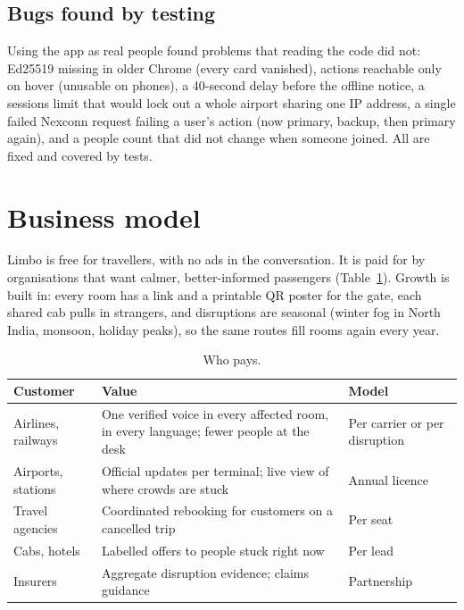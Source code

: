 \documentclass[10pt,twocolumn]{article}
\begin{document}
\subsection{Bugs found by testing}
Using the app as real people found problems that reading the code did not: Ed25519 missing in older Chrome (every card
vanished), actions reachable only on hover (unusable on phones), a 40-second delay before the offline notice, a
sessions limit that would lock out a whole airport sharing one IP address, a single failed Nexconn request failing a
user's action (now primary, backup, then primary again), and a people count that did not change when someone joined.
All are fixed and covered by tests.

\section{Business model}\label{sec:biz}
Limbo is free for travellers, with no ads in the conversation. It is paid for by organisations that want calmer,
better-informed passengers (Table~\ref{tab:biz}). Growth is built in: every room has a link and a printable QR poster
for the gate, each shared cab pulls in strangers, and disruptions are seasonal (winter fog in North India, monsoon,
holiday peaks), so the same routes fill rooms again every year.

\begin{table}[t]
\centering\small
\caption{Who pays.}
\label{tab:biz}
\begin{tabularx}{\columnwidth}{@{}>{\raggedright\arraybackslash}p{2.3cm} X >{\raggedright\arraybackslash}p{1.7cm}@{}}
\toprule
\textbf{Customer} & \textbf{Value} & \textbf{Model} \\
\midrule
Airlines, railways & One verified voice in every affected room, in every language; fewer people at the desk & Per carrier or per disruption \\
Airports, stations & Official updates per terminal; live view of where crowds are stuck & Annual licence \\
Travel agencies & Coordinated rebooking for customers on a cancelled trip & Per seat \\
Cabs, hotels & Labelled offers to people stuck right now & Per lead \\
Insurers & Aggregate disruption evidence; claims guidance & Partnership \\
\bottomrule
\end{tabularx}
\end{table}
\end{document}

